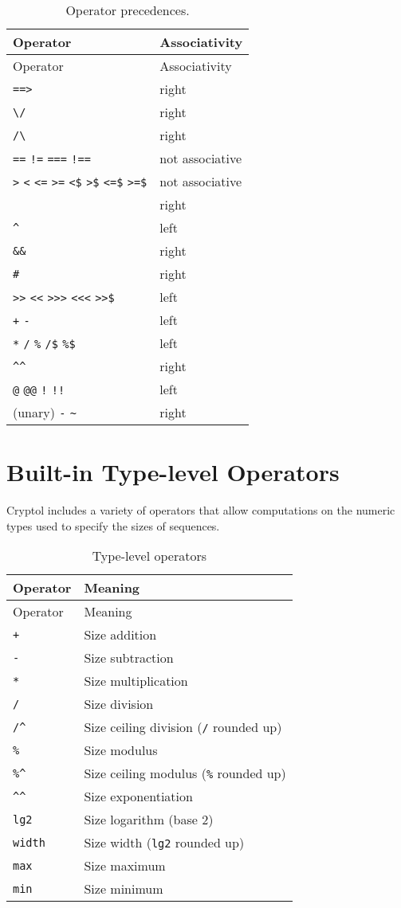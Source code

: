 \begin{longtable}[]{@{}ll@{}}
\caption{Operator precedences.}\tabularnewline
\toprule
Operator & Associativity\tabularnewline
\midrule
\endfirsthead
\toprule
Operator & Associativity\tabularnewline
\midrule
\endhead
\texttt{==\textgreater{}} & right\tabularnewline
\texttt{\textbackslash{}/} & right\tabularnewline
\texttt{/\textbackslash{}} & right\tabularnewline
\texttt{==} \texttt{!=} \texttt{===} \texttt{!==} & not
associative\tabularnewline
\texttt{\textgreater{}} \texttt{\textless{}} \texttt{\textless{}=}
\texttt{\textgreater{}=} \texttt{\textless{}\$}
\texttt{\textgreater{}\$} \texttt{\textless{}=\$}
\texttt{\textgreater{}=\$} & not associative\tabularnewline
\texttt{\textbar{}\textbar{}} & right\tabularnewline
\texttt{\^{}} & left\tabularnewline
\texttt{\&\&} & right\tabularnewline
\texttt{\#} & right\tabularnewline
\texttt{\textgreater{}\textgreater{}} \texttt{\textless{}\textless{}}
\texttt{\textgreater{}\textgreater{}\textgreater{}}
\texttt{\textless{}\textless{}\textless{}}
\texttt{\textgreater{}\textgreater{}\$} & left\tabularnewline
\texttt{+} \texttt{-} & left\tabularnewline
\texttt{*} \texttt{/} \texttt{\%} \texttt{/\$} \texttt{\%\$} &
left\tabularnewline
\texttt{\^{}\^{}} & right\tabularnewline
\texttt{@} \texttt{@@} \texttt{!} \texttt{!!} & left\tabularnewline
(unary) \texttt{-} \texttt{\textasciitilde{}} & right\tabularnewline
\bottomrule
\end{longtable}

\hypertarget{built-in-type-level-operators}{%
\section{Built-in Type-level
Operators}\label{built-in-type-level-operators}}

Cryptol includes a variety of operators that allow computations on the
numeric types used to specify the sizes of sequences.

\begin{longtable}[]{@{}ll@{}}
\caption{Type-level operators}\tabularnewline
\toprule
Operator & Meaning\tabularnewline
\midrule
\endfirsthead
\toprule
Operator & Meaning\tabularnewline
\midrule
\endhead
\texttt{+} & Size addition\tabularnewline
\texttt{-} & Size subtraction\tabularnewline
\texttt{*} & Size multiplication\tabularnewline
\texttt{/} & Size division\tabularnewline
\texttt{/\^{}} & Size ceiling division (\texttt{/} rounded
up)\tabularnewline
\texttt{\%} & Size modulus\tabularnewline
\texttt{\%\^{}} & Size ceiling modulus (\texttt{\%} rounded
up)\tabularnewline
\texttt{\^{}\^{}} & Size exponentiation\tabularnewline
\texttt{lg2} & Size logarithm (base 2)\tabularnewline
\texttt{width} & Size width (\texttt{lg2} rounded up)\tabularnewline
\texttt{max} & Size maximum\tabularnewline
\texttt{min} & Size minimum\tabularnewline
\bottomrule
\end{longtable}

